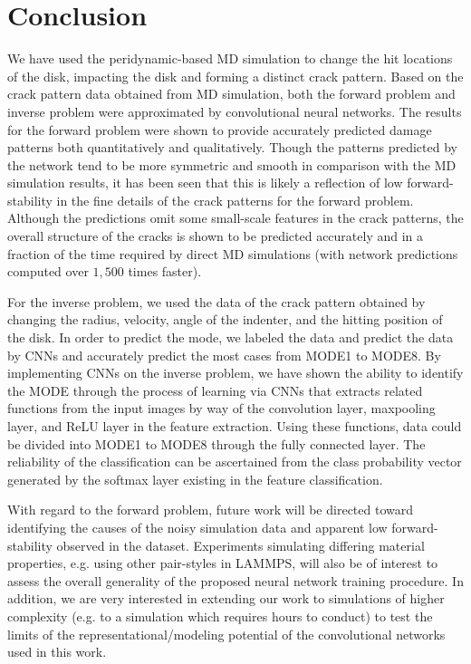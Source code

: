 \section{Conclusion}
\label{sec:5}


We have used the peridynamic-based MD simulation to change the hit locations of the disk, impacting the disk and forming a distinct crack pattern. Based on the crack pattern data obtained from MD simulation, both the forward problem and inverse problem were approximated by convolutional neural networks.  The results for the forward problem were shown to provide accurately predicted damage patterns both quantitatively and qualitatively.  Though the patterns predicted by the network tend to be more symmetric and smooth in comparison with the MD simulation results, it has been seen that this is likely a reflection of low forward-stability in the fine details of the crack patterns for the forward problem.  Although the predictions omit some small-scale features in the crack patterns, the overall structure of the cracks is shown to be predicted accurately and in a fraction of the time required by direct MD simulations (with network predictions computed over $1,500$ times faster).

For the inverse problem, we used the data of the crack pattern obtained by changing the radius, velocity, angle of the indenter, and the hitting position of the disk. In order to predict the mode, we labeled the data and predict the data by CNNs and accurately predict the most cases from MODE1 to MODE8. By implementing CNNs on the inverse problem, we have shown the ability to identify the MODE through the process of learning via CNNs that extracts related functions from the input images by way of the convolution layer, maxpooling layer, and ReLU layer in the feature extraction. Using these functions, data could be divided into MODE1 to MODE8 through the fully connected layer. The reliability of the classification can be ascertained from the class probability vector generated by the softmax layer existing in the feature classification. 

With regard to the forward problem, future work will be directed toward identifying the causes of the noisy simulation data and apparent low forward-stability observed in the dataset.  Experiments simulating differing material properties, e.g. using other pair-styles in LAMMPS, will also be of interest to assess the overall generality of the proposed neural network training procedure.  In addition, we are very interested in extending our work to simulations of higher complexity (e.g. to a simulation which requires hours to conduct) to test the limits of the representational/modeling potential of the convolutional networks used in this work.

